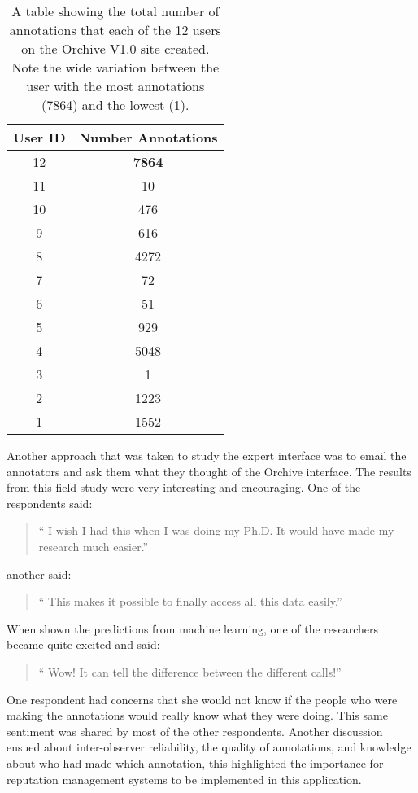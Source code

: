 \begin{table}
\begin{tabular}{|c|c|}
\hline
User ID & Number Annotations \\
\hline
12  & \textbf{7864} \\
11  & 10 \\
10  & 476 \\
9  &  616 \\
8  &  4272 \\
7  &  72 \\
6  &  51 \\
5  &  929 \\
4  &  5048 \\
3  &  1 \\
2  &  1223 \\
1  &  1552 \\
\hline
\end{tabular}
\caption{A table showing the total number of annotations that each of
  the 12 users on the Orchive V1.0 site created.  Note the wide
  variation between the user with the most annotations (7864) and the
  lowest (1).}
\label{table:expert-annotations}
\end{table}

Another approach that was taken to study the expert interface was to
email the annotators and ask them what they thought of the Orchive
interface.  The results from this field study were very interesting
and encouraging.  One of the respondents said:

\begin{quote}
`` I wish I had this when I was doing my Ph.D.  It would have made my
  research much easier.''
\end{quote}

another said:

\begin{quote}
`` This makes it possible to finally access all this data easily.''
\end{quote}

When shown the predictions from machine learning, one of the
researchers became quite excited and said:

\begin{quote}
`` Wow!  It can tell the difference between the different calls!''
\end{quote}

One respondent had concerns that she would not know if the people who
were making the annotations would really know what they were doing.
This same sentiment was shared by most of the other respondents.
Another discussion ensued about inter-observer reliability, the
quality of annotations, and knowledge about who had made which
annotation, this highlighted the importance for reputation management
systems to be implemented in this application.

